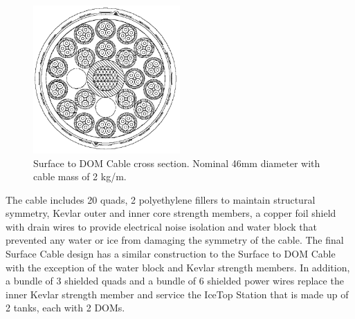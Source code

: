 \begin{figure}
  \centering
  \includegraphics[width=0.5\textwidth]{graphics/cables/cable_xsection.png}
  \caption{\label{fig:cable_xsection}Surface to DOM Cable cross
    section. Nominal 46mm diameter with cable mass of 2 kg/m.} 
\end{figure}

The cable includes 20 quads, 2 polyethylene fillers to maintain structural
symmetry, Kevlar outer and inner core strength members, a copper foil
shield with drain wires to provide electrical noise isolation and water
block that prevented any water or ice from damaging the symmetry of the
cable. The final Surface Cable design has a similar construction to the
Surface to DOM Cable with the exception of the water block and Kevlar
strength members. In addition, a bundle of 3 shielded quads and a bundle of
6 shielded power wires replace the inner Kevlar strength member and service
the IceTop Station that is made up of 2 tanks, each with 2 DOMs.

